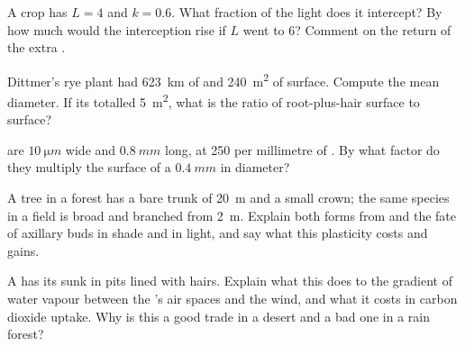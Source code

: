 \begin{exercise}[$\star\star$]\label{exo:b1:flowering-plant-organization:7}
A crop has $L = 4$ and $k = 0.6$. What fraction of the light does it
intercept? By how much would the interception rise if $L$ went to 6?
Comment on the return of the extra .
\end{exercise}

\begin{exercise}[$\star\star$]\label{exo:b1:flowering-plant-organization:8}
Dittmer's rye plant had \qty{623}{km} of  and \qty{240}{m^2} of
 surface. Compute the mean  diameter. If its  totalled
\qty{5}{m^2}, what is the ratio of root-plus-hair surface to 
surface?
\end{exercise}

\begin{exercise}[$\star\star$]\label{exo:b1:flowering-plant-organization:9}
 are $\qty{10}{\micro m}$ wide and $\qty{0.8}{mm}$ long, at
\qty{250}{} per millimetre of . By what factor do they multiply the
surface of a  $\qty{0.4}{mm}$ in diameter?
\end{exercise}

\begin{exercise}[$\star\star\star$]\label{exo:b1:flowering-plant-organization:10}
A tree in a forest has a bare trunk of \qty{20}{m} and a small crown;
the same species in a field is broad and branched from \qty{2}{m}.
Explain both forms from  and the fate of axillary buds in
shade and in light, and say what this plasticity costs and gains.
\end{exercise}

\begin{exercise}[$\star\star\star$]\label{exo:b1:flowering-plant-organization:11}
A  has its  sunk in pits lined with hairs. Explain
what this does to the gradient of water vapour between the 's air
spaces and the wind, and what it costs in carbon dioxide uptake. Why
is this a good trade in a desert and a bad one in a rain forest?
\end{exercise}

